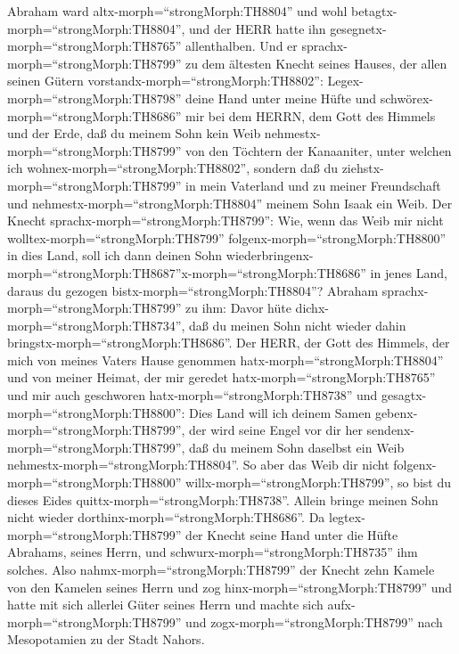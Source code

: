  Abraham ward altx-morph=``strongMorph:TH8804'' und wohl
betagtx-morph=``strongMorph:TH8804'', und der HERR hatte ihn
gesegnetx-morph=``strongMorph:TH8765'' allenthalben.  Und er
sprachx-morph=``strongMorph:TH8799'' zu dem ältesten Knecht seines
Hauses, der allen seinen Gütern vorstandx-morph=``strongMorph:TH8802'':
Legex-morph=``strongMorph:TH8798'' deine Hand unter meine Hüfte
 und schwörex-morph=``strongMorph:TH8686'' mir bei dem
HERRN, dem Gott des Himmels und der Erde, daß du meinem Sohn kein Weib
nehmestx-morph=``strongMorph:TH8799'' von den Töchtern der Kanaaniter,
unter welchen ich wohnex-morph=``strongMorph:TH8802'', 
sondern daß du ziehstx-morph=``strongMorph:TH8799'' in mein Vaterland
und zu meiner Freundschaft und nehmestx-morph=``strongMorph:TH8804''
meinem Sohn Isaak ein Weib.  Der Knecht
sprachx-morph=``strongMorph:TH8799'': Wie, wenn das Weib mir nicht
wolltex-morph=``strongMorph:TH8799''
folgenx-morph=``strongMorph:TH8800'' in dies Land, soll ich dann deinen
Sohn
wiederbringenx-morph=``strongMorph:TH8687''x-morph=``strongMorph:TH8686''
in jenes Land, daraus du gezogen bistx-morph=``strongMorph:TH8804''?
 Abraham sprachx-morph=``strongMorph:TH8799'' zu ihm: Davor
hüte dichx-morph=``strongMorph:TH8734'', daß du meinen Sohn nicht wieder
dahin bringstx-morph=``strongMorph:TH8686''.  Der HERR, der
Gott des Himmels, der mich von meines Vaters Hause genommen
hatx-morph=``strongMorph:TH8804'' und von meiner Heimat, der mir geredet
hatx-morph=``strongMorph:TH8765'' und mir auch geschworen
hatx-morph=``strongMorph:TH8738'' und
gesagtx-morph=``strongMorph:TH8800'': Dies Land will ich deinem Samen
gebenx-morph=``strongMorph:TH8799'', der wird seine Engel vor dir her
sendenx-morph=``strongMorph:TH8799'', daß du meinem Sohn daselbst ein
Weib nehmestx-morph=``strongMorph:TH8804''.  So aber das
Weib dir nicht folgenx-morph=``strongMorph:TH8800''
willx-morph=``strongMorph:TH8799'', so bist du dieses Eides
quittx-morph=``strongMorph:TH8738''. Allein bringe meinen Sohn nicht
wieder dorthinx-morph=``strongMorph:TH8686''.  Da
legtex-morph=``strongMorph:TH8799'' der Knecht seine Hand unter die
Hüfte Abrahams, seines Herrn, und schwurx-morph=``strongMorph:TH8735''
ihm solches.  Also nahmx-morph=``strongMorph:TH8799'' der
Knecht zehn Kamele von den Kamelen seines Herrn und zog
hinx-morph=``strongMorph:TH8799'' und hatte mit sich allerlei Güter
seines Herrn und machte sich aufx-morph=``strongMorph:TH8799'' und
zogx-morph=``strongMorph:TH8799'' nach Mesopotamien zu der Stadt Nahors.

